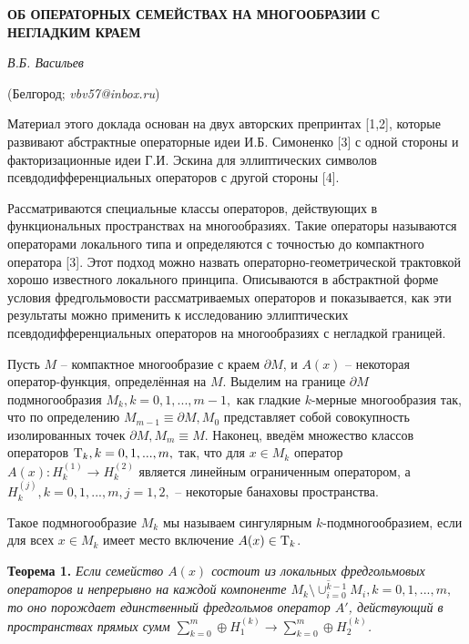 
\begin{center}
    {\bf ОБ ОПЕРАТОРНЫХ СЕМЕЙСТВАХ НА МНОГООБРАЗИИ С НЕГЛАДКИМ КРАЕМ}

    {\it В.Б. Васильев}

    (Белгород; {\it vbv57@inbox.ru})
\end{center}


Материал этого доклада основан на двух авторских препринтах [1,2], которые развивают абстрактные операторные идеи И.Б. Симоненко [3] с одной стороны и факторизационные идеи Г.И. Эскина для эллиптических символов псевдодифференциальных операторов с другой стороны [4].

Рассматриваются специальные классы операторов, действующих в функциональных пространствах на многообразиях. Такие операторы называются операторами локального типа и определяются с точностью до компактного оператора [3]. Этот подход можно назвать операторно-геометрической трактовкой хорошо известного локального принципа. Описываются в абстрактной форме условия фредгольмовости рассматриваемых операторов и показывается, как эти результаты можно применить к исследованию эллиптических псевдодифференциальных операторов на многообразиях с негладкой границей.

Пусть $M$ --  компактное многообразие с краем $\partial M$, и  $A(x)$ -- некоторая оператор-функция, определённая на $M$. Выделим на границе $\partial M$ подмногообразия $M_k, k=0,1,...,m-1,$ как гладкие $k$-мерные многообразия так, что по определению  $M_{m-1}\equiv\partial M, M_0$ представляет собой совокупность изолированных точек $\partial M, M_m\equiv M$. Наконец, введём множество классов операторов  ${\rm T}_k, k=0,1,...,m,$ так, что для $x\in M_k$ оператор $A(x): H^{(1)}_k\rightarrow  H^{(2)}_k$ является линейным ограниченным оператором, а $H^{(j)}_k, k=0,1,...,m, j=1,2,$ -- некоторые банаховы пространства.


Такое подмногообразие $M_k$ мы называем сингулярным  $k$-подмногообразием, если для всех $x\in M_k$ имеет место включение $A(x)\in{\rm T}_k$.

\textbf{Теорема 1.} {\it
Если семейство $A(x)$ состоит из локальных фредгольмовых операторов и непрерывно на каждой компоненте $\overline{M_k\setminus\cup_{i=0}^{k-1}M_i}, k=0,1,...,m,$ то оно порождает единственный фредгольмов оператор
$A'$, действующий в пространствах прямых сумм  $\sum\limits_{k=0}^m\oplus H^{(k)}_1\rightarrow\sum\limits_{k=0}^m\oplus H^{(k)}_2$.
}


